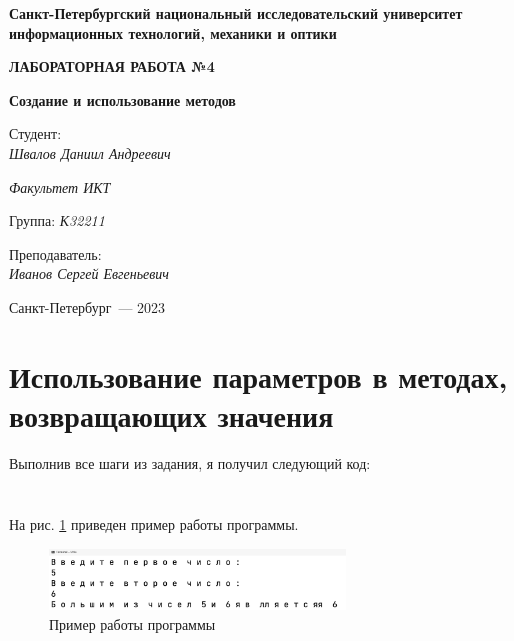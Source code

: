\documentclass[a4paper,14pt]{extarticle}
\numberwithin{figure}{section}
\begin{document}
\begin{titlepage}
    \vspace{0pt plus2fill}
    \noindent

    \vspace{0pt plus6fill}
    \begin{center}
        \textbf{\large{Санкт-Петербургский национальный исследовательский университет информационных
                технологий, механики и оптики}}

        \vspace{0pt plus2fill}
        \textbf{\Large{ЛАБОРАТОРНАЯ РАБОТА №4}}

        \vspace{0pt plus2fill}
        \textbf{\large{Создание и использование методов}}
    \end{center}

    \vspace{0pt plus8fill}
    \begin{flushright}
        Студент: \\
        \textit{Швалов Даниил Андреевич}

        \textit{Факультет ИКТ}

        Группа: \textit{К32211}

        Преподаватель: \\
        \textit{Иванов Сергей Евгеньевич}
    \end{flushright}

    \vspace{0pt plus4fill}
    \begin{center}
        {Санкт-Петербург~--- 2023}
    \end{center}
\end{titlepage}

\section{Использование параметров в методах, возвращающих значения}

Выполнив все шаги из задания, я получил следующий код:

\inputminted{csharp}{../Utils/Utils/Utils.cs}

\inputminted{csharp}{../Utils/Utils/Program.cs}

На рис. \ref{fig:task-1} приведен пример работы программы.

\begin{figure}[H]
    \centering
    \includegraphics[width=0.7\textwidth]{images/task-1.png}
    \caption{Пример работы программы}
    \label{fig:task-1}
\end{figure}
\end{document}
